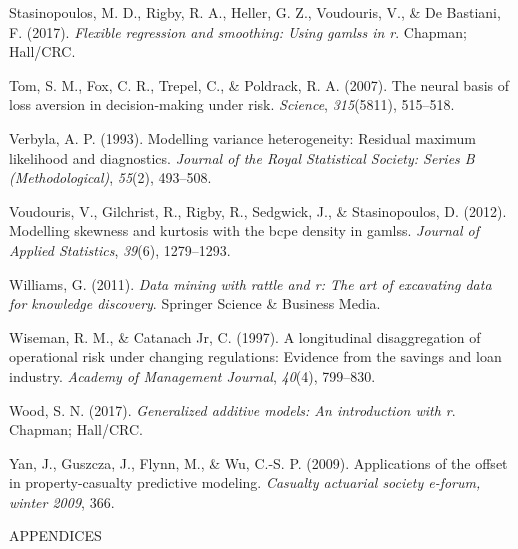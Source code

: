 \documentclass{DissertateUSU}
\begin{document}
\leavevmode\hypertarget{ref-stasinopoulos2017flexible}{}%
Stasinopoulos, M. D., Rigby, R. A., Heller, G. Z., Voudouris, V., \& De
Bastiani, F. (2017). \emph{Flexible regression and smoothing: Using
gamlss in r}. Chapman; Hall/CRC.

\leavevmode\hypertarget{ref-tom2007neural}{}%
Tom, S. M., Fox, C. R., Trepel, C., \& Poldrack, R. A. (2007). The
neural basis of loss aversion in decision-making under risk.
\emph{Science}, \emph{315}(5811), 515--518.

\leavevmode\hypertarget{ref-verbyla1993modelling}{}%
Verbyla, A. P. (1993). Modelling variance heterogeneity: Residual
maximum likelihood and diagnostics. \emph{Journal of the Royal
Statistical Society: Series B (Methodological)}, \emph{55}(2), 493--508.

\leavevmode\hypertarget{ref-voudouris2012modelling}{}%
Voudouris, V., Gilchrist, R., Rigby, R., Sedgwick, J., \& Stasinopoulos,
D. (2012). Modelling skewness and kurtosis with the bcpe density in
gamlss. \emph{Journal of Applied Statistics}, \emph{39}(6), 1279--1293.

\leavevmode\hypertarget{ref-williams2011data}{}%
Williams, G. (2011). \emph{Data mining with rattle and r: The art of
excavating data for knowledge discovery}. Springer Science \& Business
Media.

\leavevmode\hypertarget{ref-wiseman1997longitudinal}{}%
Wiseman, R. M., \& Catanach Jr, C. (1997). A longitudinal disaggregation
of operational risk under changing regulations: Evidence from the
savings and loan industry. \emph{Academy of Management Journal},
\emph{40}(4), 799--830.

\leavevmode\hypertarget{ref-wood2017generalized}{}%
Wood, S. N. (2017). \emph{Generalized additive models: An introduction
with r}. Chapman; Hall/CRC.

\leavevmode\hypertarget{ref-yan2009applications}{}%
Yan, J., Guszcza, J., Flynn, M., \& Wu, C.-S. P. (2009). Applications of
the offset in property-casualty predictive modeling. \emph{Casualty
actuarial society e-forum, winter 2009}, 366.

\clearpage
{}
\fancyhead[R]{\thepage}
\fancyfoot[C]{}

\vspace*{\fill}
  \begin{center}
    APPENDICES 
  \end{center}
\vspace*{\fill}
\end{document}
